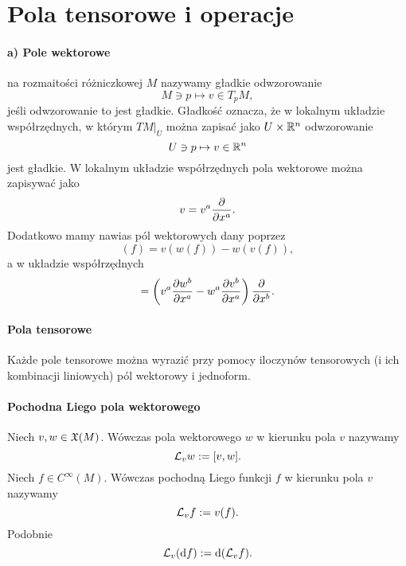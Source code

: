 \documentclass[11pt]{book}
\theoremstyle{definition} %
\theoremstyle{plain} %
\theoremstyle{remark} %
\theoremstyle{underline}
\begin{document}
  \section{Pola tensorowe i operacje}
  \paragraph{a) Pole wektorowe}
   na rozmaitości różniczkowej $M$ nazywamy gładkie odwzorowanie 
  \begin{displaymath}
    M \ni p \mapsto v \in T_p M,
  \end{displaymath}
  jeśli odwzorowanie to jest gładkie.
  Gładkość oznacza, że w lokalnym układzie współrzędnych, w którym $TM|_U$ można zapisać jako
  $U \times \mathbb{R}^n$ odwzorowanie
  \begin{displaymath}
    U \ni p \mapsto v  \in \mathbb{R}^n
  \end{displaymath}
  jest gładkie.
  W lokalnym układzie współrzędnych pola wektorowe można zapisywać jako
  \begin{displaymath}
    v = v^a \frac{\partial }{\partial x^a}.
  \end{displaymath}
  Dodatkowo mamy nawias pól wektorowych dany poprzez
  \begin{displaymath}
    [v, w] (f) = v(w(f)) - w(v(f)),
  \end{displaymath}
  a w układzie współrzędnych
  \begin{displaymath}
    [v, w] = \left( v^a \ptf{w^b}{x^a} - w^a \ptf{v^b}{x^a} \right) \ptf{}{x^b}.
  \end{displaymath}
  
  
  \paragraph{Pola tensorowe}
  Każde pole tensorowe można wyrazić przy pomocy iloczynów tensorowych (i ich kombinacji liniowych) pól wektorowy i jednoform.

  \paragraph{Pochodna Liego pola wektorowego}
  Niech $v, w \in \mathfrak{X}(M)$. Wówczas  pola wektorowego $w$ w kierunku pola $v$ nazywamy
  \begin{displaymath}
    \mathcal{L}_v w :=[v, w].
  \end{displaymath}
  Niech $f \in C^\infty(M)$. 
  Wówczas pochodną Liego funkcji $f$ w kierunku pola $v$ nazywamy
  \begin{displaymath}
    \mathcal{L}_v f:= v(f).
  \end{displaymath}
  Podobnie
  \begin{displaymath}
    \mathcal{L}_v(\mathrm{d} f) := \mathrm{d} (\mathcal{L}_v f).
  \end{displaymath}
\end{document}
